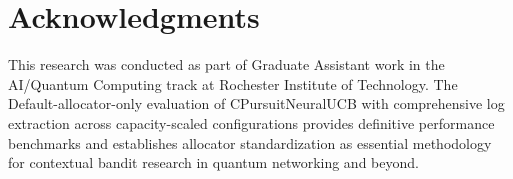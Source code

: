 \documentclass[12pt,a4paper]{article}
\begin{document}
\section{Acknowledgments}

This research was conducted as part of Graduate Assistant work in the AI/Quantum Computing track at Rochester Institute of Technology. The Default-allocator-only evaluation of CPursuitNeuralUCB with comprehensive log extraction across capacity-scaled configurations provides definitive performance benchmarks and establishes allocator standardization as essential methodology for contextual bandit research in quantum networking and beyond.
\end{document}
